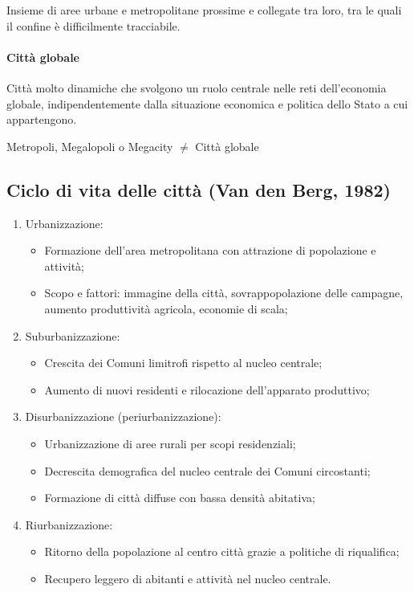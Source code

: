 \documentclass{article}
\begin{document}
Insieme di aree urbane e metropolitane prossime e collegate tra loro, tra le quali il confine
è difficilmente tracciabile.

\hypertarget{città globale}{\paragraph*{Città globale} \phantom{}}

Città molto dinamiche che svolgono un ruolo centrale nelle reti dell'economia globale,
indipendentemente dalla situazione economica e politica dello Stato a cui appartengono.

Metropoli, Megalopoli o Megacity $\neq$ Città globale

\subsection{Ciclo di vita delle città (Van den Berg, 1982)}
\begin{enumerate}
    \item Urbanizzazione:
        \begin{itemize}
            \item Formazione dell'area metropolitana con attrazione di popolazione e attività;
            \item Scopo e fattori: immagine della città, sovrappopolazione delle campagne, aumento
                produttività agricola, economie di scala;
        \end{itemize}
    \item Suburbanizzazione:
        \begin{itemize}
            \item Crescita dei Comuni limitrofi rispetto al nucleo centrale;
            \item Aumento di nuovi residenti e rilocazione dell'apparato produttivo;
        \end{itemize}
    \item Disurbanizzazione (periurbanizzazione):
        \begin{itemize}
            \item Urbanizzazione di aree rurali per scopi residenziali;
            \item Decrescita demografica del nucleo centrale dei Comuni circostanti;
            \item Formazione di città diffuse con bassa densità abitativa;
        \end{itemize}
    \item Riurbanizzazione:
        \begin{itemize}
            \item Ritorno della popolazione al centro città grazie a politiche di riqualifica;
            \item Recupero leggero di abitanti e attività nel nucleo centrale.
        \end{itemize}
\end{enumerate}
\end{document}
